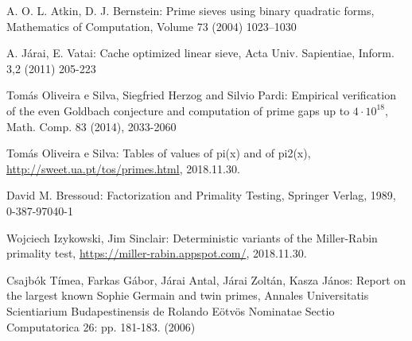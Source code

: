 \documentclass[12pt]{report}
\begin{document}


\begin{thebibliography}{9}

A. O. L. Atkin, D. J. Bernstein: Prime sieves using binary quadratic forms, Mathematics of Computation, Volume 73 (2004) 1023–1030

A. Járai, E. Vatai: Cache optimized linear sieve, Acta Univ. Sapientiae, Inform. 3,2 (2011) 205-223

Tomás Oliveira e Silva, Siegfried Herzog and Silvio Pardi: Empirical verification of the even Goldbach conjecture and computation of prime gaps up to $4\cdot10^{18}$, Math. Comp. 83 (2014), 2033-2060

Tomás Oliveira e Silva: Tables of values of pi(x) and of pi2(x), \url{http://sweet.ua.pt/tos/primes.html}, 2018.11.30.

David M. Bressoud: Factorization and Primality Testing, Springer Verlag, 1989, 0-387-97040-1

Wojciech Izykowski, Jim Sinclair: Deterministic variants of the Miller-Rabin primality test, \url{https://miller-rabin.appspot.com/}, 2018.11.30.

Csajbók Tímea, Farkas Gábor, Járai Antal, Járai Zoltán, Kasza János: Report on the largest known Sophie Germain and twin primes, Annales Universitatis Scientiarium Budapestinensis de Rolando Eötvös Nominatae Sectio Computatorica 26: pp. 181-183. (2006)


\end{thebibliography}
\end{document}
